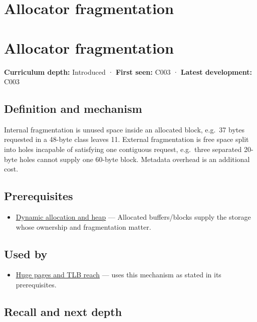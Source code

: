 \hypertarget{appendix-a7c50686d81f}{}
\section*{Allocator fragmentation}
\section{Allocator fragmentation}\label{appendix-a7c50686d81f-allocator-fragmentation}

\textbf{Curriculum depth:} Introduced · \textbf{First seen:} C003 · \textbf{Latest development:} C003

\subsection{Definition and mechanism}\label{appendix-a7c50686d81f-definition-and-mechanism}

Internal fragmentation is unused space inside an allocated block, e.g.~37 bytes requested in a 48-byte class leaves 11. External fragmentation is free space split into holes incapable of satisfying one contiguous request, e.g.~three separated 20-byte holes cannot supply one 60-byte block. Metadata overhead is an additional cost.

\subsection{Prerequisites}\label{appendix-a7c50686d81f-prerequisites}

\begin{itemize}
\tightlist
\item
  \hyperref[appendix-c3480f7d9ff3]{Dynamic allocation and heap} --- Allocated buffers/blocks supply the storage whose ownership and fragmentation matter.
\end{itemize}

\subsection{Used by}\label{appendix-a7c50686d81f-used-by}

\begin{itemize}
\tightlist
\item
  \hyperref[appendix-ce688d1acdab]{Huge pages and TLB reach} --- uses this mechanism as stated in its prerequisites.
\end{itemize}

\subsection{Recall and next depth}\label{appendix-a7c50686d81f-recall-and-next-depth}

